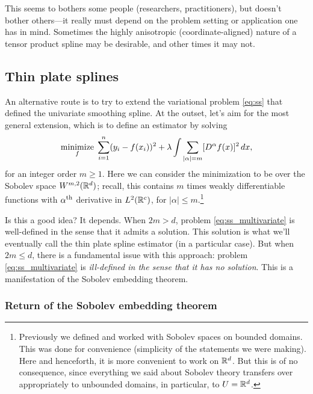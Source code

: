 \documentclass{article}
\begin{document}
This seems to bothers some people (researchers, practitioners), but doesn't
bother others---it really must depend on the problem setting or application one
has in mind. Sometimes the highly anisotropic (coordinate-aligned) nature of a
tensor product spline may be desirable, and other times it may not.    

\subsection{Thin plate splines}

An alternative route is to try to extend the variational problem \eqref{eq:ss}
that defined the univariate smoothing spline. At the outset, let's aim for the
most general extension, which is to define an estimator by solving
\begin{equation}
\label{eq:ss_multivariate}
\mathop{\mathrm{minimize}}_f \; \sum_{i=1}^n (y_i - f(x_i))^2 + \lambda \int \sum_{|\alpha| =  m}
[D^\alpha f(x)]^2 \, dx, 
\end{equation}
for an integer order $m \geq 1$. Here we can consider the minimization to be
over the Sobolev space $W^{m,2}(\mathbb{R}^d)$; recall, this contains $m$ times weakly
differentiable functions with $\alpha^{\text{th}}$ derivative in $L^2(\mathbb{R}^c)$, for
$|\alpha| \leq m$.\footnote{Previously we defined and worked with Sobolev
  spaces on bounded domains. This was done for convenience (simplicity of the
  statements we were making). Here and henceforth, it is more convenient to work
  on $\mathbb{R}^d$. But this is of no consequence, since everything we said about
  Sobolev theory transfers over appropriately to unbounded domains, in
  particular, to $U=\mathbb{R}^d$.}  

Is this a good idea? It depends. When $2m > d$, problem
\eqref{eq:ss_multivariate} is well-defined in the sense that it admits a
solution. This solution is what we'll eventually call the thin plate spline
estimator (in a particular case). But when $2m \leq d$, there is a fundamental
issue with this approach: problem \eqref{eq:ss_multivariate} is
\emph{ill-defined in the sense that it has no solution}. This is a manifestation
of the Sobolev embedding theorem.

\subsubsection{Return of the Sobolev embedding theorem}
\end{document}

